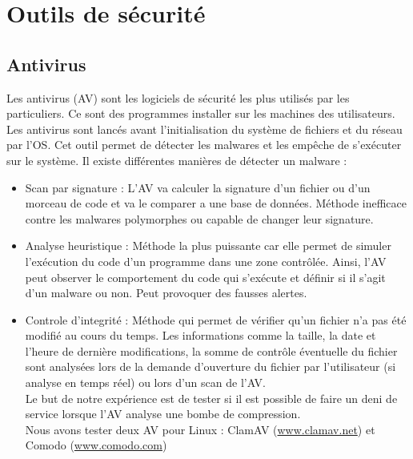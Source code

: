 \documentclass[smallextended]{svjour3}       %
\begin{document}
\section{Outils de sécurité}
\label{2.Outils}

\subsection{Antivirus}
\label{2.1antivirus}
Les antivirus (AV) sont les logiciels de sécurité les plus utilisés par les particuliers. Ce sont des programmes installer sur les machines des utilisateurs. Les antivirus sont lancés avant l'initialisation du système de fichiers et du réseau par l'OS. Cet outil permet de détecter les malwares et les empêche de s’exécuter sur le système. Il existe différentes manières de détecter un malware : 
\begin{itemize}
\item Scan par signature : L'AV va calculer la signature d'un fichier ou d'un morceau de code et va le comparer a une base de données. Méthode inefficace contre les malwares polymorphes ou capable de changer leur signature.
\item Analyse heuristique : Méthode la plus puissante car elle permet de simuler l’exécution du code d'un programme dans une zone contrôlée. Ainsi, l'AV peut observer le comportement du code qui s’exécute et définir si il s'agit d'un malware ou non. Peut provoquer des fausses alertes.
\item Controle d'integrité : Méthode qui permet de vérifier qu'un fichier n'a pas été modifié au cours du temps. Les informations comme la taille, la date et l'heure de dernière modifications, la somme de contrôle éventuelle du fichier sont analysées lors de la demande d'ouverture du fichier par l'utilisateur (si analyse en temps réel) ou lors d'un scan de l'AV.\\
Le but de notre expérience est de tester si il est possible de faire un deni de service lorsque l'AV analyse une bombe de compression.\\
Nous avons tester deux AV pour Linux : ClamAV (\url{www.clamav.net}) et Comodo (\url{www.comodo.com})\\
\end{itemize}
\end{document}
